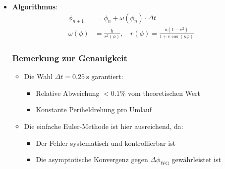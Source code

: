 \begin{itemize}
    \item \textbf{Algorithmus}:
    \begin{align*}
    \phi_{n+1} &= \phi_n + \omega(\phi_n) \cdot \Delta t \\
    \omega(\phi) &= \frac{h}{r^2(\phi)}, \quad r(\phi) = \frac{a(1-e^2)}{1 + e \cos(\kappa \phi)}
    \end{align*}

    \subsubsection*{Bemerkung zur Genauigkeit}
    \begin{itemize}
        \item Die Wahl $\Delta t = \SI{0.25}{\second}$ garantiert:
            \begin{itemize}
                \item Relative Abweichung $< 0.1\%$ vom theoretischen Wert
                \item Konstante Periheldrehung pro Umlauf
            \end{itemize}
        \item Die einfache Euler-Methode ist hier ausreichend, da:
        \begin{itemize}
            \item Der Fehler systematisch und kontrollierbar ist
            \item Die asymptotische Konvergenz gegen $\Delta\phi_{\text{WG}}$ gewährleistet ist
        \end{itemize}
    \end{itemize}
\end{itemize}
